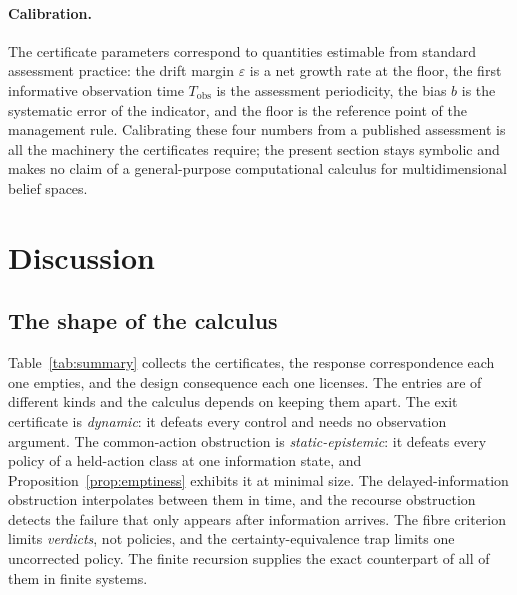 \documentclass[11pt,a4paper]{article}
\theoremstyle{plain}
\theoremstyle{definition}
\theoremstyle{remark}
\newcommand{\Tobs}{T_{\mathrm{obs}}}
\begin{document}
\paragraph{Calibration.} The certificate parameters correspond to quantities estimable from standard assessment practice: the drift margin $\varepsilon$ is a net growth rate at the floor, the first informative observation time $\Tobs$ is the assessment periodicity, the bias $b$ is the systematic error of the indicator, and the floor is the reference point of the management rule. Calibrating these four numbers from a published assessment is all the machinery the certificates require; the present section stays symbolic and makes no claim of a general-purpose computational calculus for multidimensional belief spaces.
\section{Discussion}\label{sec:discussion}

\subsection{The shape of the calculus}\label{sec:shape}

Table~\ref{tab:summary} collects the certificates, the response correspondence each one empties, and the design consequence each one licenses. The entries are of different kinds and the calculus depends on keeping them apart. The exit certificate is \emph{dynamic}: it defeats every control and needs no observation argument. The common-action obstruction is \emph{static-epistemic}: it defeats every policy of a held-action class at one information state, and Proposition~\ref{prop:emptiness} exhibits it at minimal size. The delayed-information obstruction interpolates between them in time, and the recourse obstruction detects the failure that only appears after information arrives. The fibre criterion limits \emph{verdicts}, not policies, and the certainty-equivalence trap limits one uncorrected policy. The finite recursion supplies the exact counterpart of all of them in finite systems.
\end{document}
